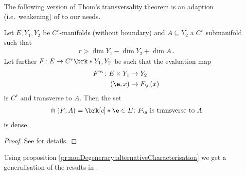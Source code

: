The following version of Thom's transversality theorem is an adaption (i.e.\ weakening) of \cite[Theorem 2.7]{Hirsch1994} to our needs.
\begin{theorem}
  Let $E,Y_1,Y_2$ be $C^r$-manifolds (without boundary) and $A\subseteq Y_2$ a $C^r$ submanifold such that
  \begin{align*}
    r>\dim Y_1-\dim Y_2+\dim A\,.
  \end{align*}
  Let further $F\colon E\to C^r\brk*{Y_1,Y_2}$ be such that the evaluation map
  \begin{align*}
    F^\text{ev}\colon E\times Y_1&\to Y_2 \\
    (\e,x)&\mapsto F_\e(x)
  \end{align*}
  is $C^r$ and transverse to $A$.
  Then the set
  \begin{align*}
    \pitchfork(F;A)=\brk[c]*{\e\in E\colon F_\e\text{ is transverse to } A}
  \end{align*}
  is dense.
\end{theorem}
\begin{proof}
  See \cite[Theorem 2.7]{Hirsch1994} for details.
\end{proof}
Using proposition \ref{pr:nonDegeneracy:alternativeCharacterisation} 
we get a generalisation of the results in \cite[§2]{Morse1970}.

